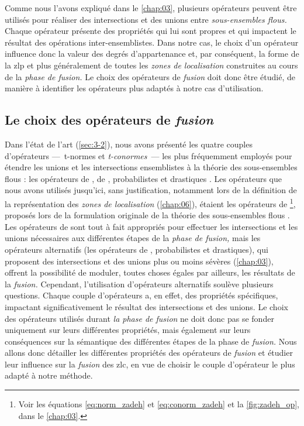Comme nous l'avons expliqué dans le \autoref{chap:03}, plusieurs
opérateurs peuvent être utilisés pour réaliser des intersections et
des unions entre \emph{sous-ensembles flous.} Chaque opérateur
présente des propriétés qui lui sont propres et qui impactent le
résultat des opérations inter-ensemblistes. Dans notre cas, le choix
d'un opérateur influence donc la valeur des degrés d'appartenance et,
par conséquent, la forme de la \ac{zlp} et plus généralement de toutes
les \emph{zones de localisation} construites au cours de la
\emph{phase de fusion.} Le choix des opérateurs de \emph{fusion} doit
donc être étudié, de manière à identifier les opérateurs plus adaptés
à notre cas d'utilisation.

\subsection{Le choix des opérateurs de \emph{fusion}}

Dans l'état de l'art (\autoref{sec:3-2}), nous avons présenté les
quatre couples d'opérateurs ---~t-normes et \emph{t-conormes}~--- les
plus fréquemment employés pour étendre les unions et les intersections
ensemblistes à la théorie des sous-ensembles flous : les opérateurs de
, de , probabilistes et drastiques
\autocite{Klir1995}. Les opérateurs que nous avons utilisés jusqu'ici,
sans justification, notamment lors de la définition de la
représentation des \emph{zones de localisation} (\autoref{chap:06}),
étaient les opérateurs de  \footnote{Voir les équations
  \ref{eq:norm_zadeh} et \ref{eq:conorm_zadeh} et la
  \autoref{fig:zadeh_op}, dans le \autoref{chap:03}.}, proposés lors
de la formulation originale de la théorie des sous-ensembles flous
\autocite{Zadeh1965}. Les opérateurs de  sont tout à fait
appropriés pour effectuer les intersections et les unions nécessaires
aux différentes étapes de la \emph{phase de fusion,} mais les
opérateurs alternatifs (\ie les opérateurs de ,
probabilistes et drastiques), qui proposent des intersections et des
unions plus ou moins sévères (\autoref{chap:03}), offrent la
possibilité de moduler, toutes choses égales par ailleurs, les
résultats de la \emph{fusion.} Cependant, l'utilisation d'opérateurs
alternatifs soulève plusieurs questions. Chaque couple d'opérateurs a,
en effet, des propriétés spécifiques, impactant significativement le
résultat des intersections et des unions. Le choix des opérateurs
utilisés durant \emph{la phase de fusion} ne doit donc pas se fonder
uniquement sur leurs différentes propriétés, mais également sur leurs
conséquences sur la sémantique des différentes étapes de la phase de
\emph{fusion.}  Nous allons donc détailler les différentes propriétés
des opérateurs de \emph{fusion} et étudier leur influence sur la
\emph{fusion} des \ac{zlc}, en vue de choisir le couple d'opérateur le
plus adapté à notre méthode.

